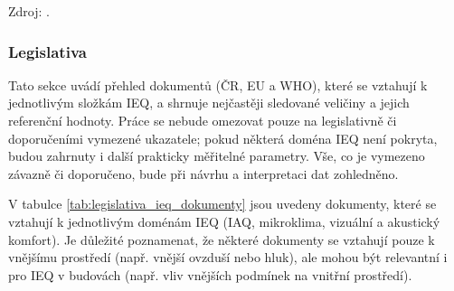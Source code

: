 \begin{table}[!tbp]
\footnotesize Zdroj: \parencite{worldhealthorganizationWHOGlobalAir2021,osephg.allenAssociationsCognitiveFunction2016,calvoScalableIoTArchitecture2022,dengImpactIndoorAir2024,mcminnAWeightingMetric2013,marshIEC61672NewInternational2001}.
\end{table}

\subsubsection{Legislativa}
Tato sekce uvádí přehled dokumentů (ČR, EU a WHO), které se vztahují k jednotlivým složkám IEQ, a shrnuje nejčastěji sledované veličiny a jejich referenční hodnoty. Práce se nebude omezovat pouze na legislativně či doporučeními vymezené ukazatele; pokud některá doména IEQ není pokryta, budou zahrnuty i další prakticky měřitelné parametry. Vše, co je vymezeno závazně či doporučeno, bude při návrhu a interpretaci dat zohledněno.

V tabulce \ref{tab:legislativa_ieq_dokumenty} jsou uvedeny dokumenty, které se vztahují k jednotlivým doménám IEQ (IAQ, mikroklima, vizuální a akustický komfort). Je důležité poznamenat, že některé dokumenty se vztahují pouze k vnějšímu prostředí (např. vnější ovzduší nebo hluk), ale mohou být relevantní i pro IEQ v budovách (např. vliv vnějších podmínek na vnitřní prostředí).

